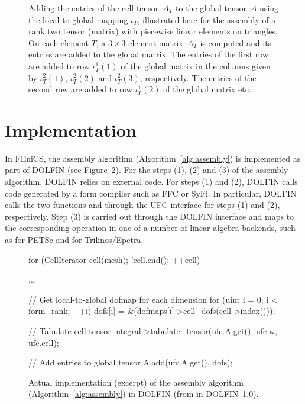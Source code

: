 \begin{figure}
  \centering
  \caption{Adding the entries of the cell tensor~$A_T$ to the global
    tensor~$A$ using the local-to-global mapping $\iota_T$,
    illustrated here for the assembly of a rank two tensor (matrix)
    with piecewise linear elements on triangles. On each element
    $T$, a $3 \times 3$ element matrix~$A_T$ is computed and its
    entries are added to the global matrix. The entries of the first
    row are added to row $\iota^1_T(1)$ of the global matrix in the
    columns given by $\iota^2_T(1)$, $\iota^2_T(2)$ and
    $\iota^2_T(3)$, respectively. The entries of the second row are
    added to row $\iota^1_T(2)$ of the global matrix etc.}
  \label{fig:insertion}
\end{figure}

\section{Implementation}

In FEniCS, the assembly algorithm (Algorithm~\ref{alg:assembly}) is
implemented as part of DOLFIN (see
Figure~\ref{fig:assembly,code}). For the steps (1), (2) and (3) of the
assembly algorithm, DOLFIN relies on external code. For steps (1) and
(2), DOLFIN calls code generated by a form compiler such as FFC or
SyFi. In particular, DOLFIN calls the two functions
 and  through the UFC
interface for steps (1) and (2), respectively. Step (3) is carried out
through the DOLFIN  interface and maps to the
corresponding operation in one of a number of linear algebra backends,
such as  for PETSc and 
for Trilinos/Epetra.

\begin{figure}
  \begin{c++}
for (CellIterator cell(mesh); !cell.end(); ++cell)
{
  ...

  // Get local-to-global dofmap for each dimension
  for (uint i = 0; i < form_rank; ++i)
    dofs[i] = &(dofmaps[i]->cell_dofs(cell->index()));

  // Tabulate cell tensor
  integral->tabulate_tensor(ufc.A.get(),
                            ufc.w,
                            ufc.cell);

  // Add entries to global tensor
  A.add(ufc.A.get(), dofs);
}
\end{c++}
  \caption{Actual implementation (excerpt) of the assembly algorithm
    (Algorithm~\ref{alg:assembly}) in DOLFIN (from 
    in DOLFIN~1.0).}
  \label{fig:assembly,code}
\end{figure}

